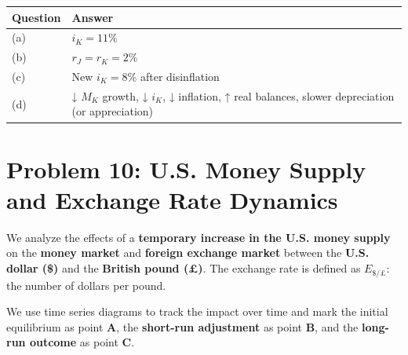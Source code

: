 \documentclass[
]{article}
\begin{document}
\begin{longtable}[]{@{}
  >{\raggedright\arraybackslash}p{}
  >{\raggedright\arraybackslash}p{}@{}}
\toprule\noalign{}
\begin{minipage}[b]{\linewidth}\raggedright
Question
\end{minipage} & \begin{minipage}[b]{\linewidth}\raggedright
Answer
\end{minipage} \\
\midrule\noalign{}
\endhead
\bottomrule\noalign{}
\endlastfoot
(a) & \(i_K = 11\%\) \\
(b) & \(r_J = r_K = 2\%\) \\
(c) & New \(i_K = 8\%\) after disinflation \\
(d) & ↓ \(M_K\) growth, ↓ \(i_K\), ↓ inflation, ↑ real balances, slower
depreciation (or appreciation) \\
\end{longtable}

\section{Problem 10: U.S. Money Supply and Exchange Rate
Dynamics}\label{problem-10-u.s.-money-supply-and-exchange-rate-dynamics}

We analyze the effects of a \textbf{temporary increase in the U.S. money
supply} on the \textbf{money market} and \textbf{foreign exchange
market} between the \textbf{U.S. dollar (\$)} and the \textbf{British
pound (£)}. The exchange rate is defined as \(E_{\$/£}\): the number of
dollars per pound.

We use time series diagrams to track the impact over time and mark the
initial equilibrium as point \textbf{A}, the \textbf{short-run
adjustment} as point \textbf{B}, and the \textbf{long-run outcome} as
point \textbf{C}.
\end{document}
